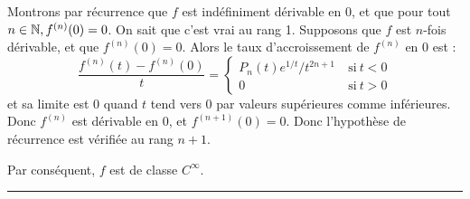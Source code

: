\documentclass[11pt,a4paper]{article}
\newcommand{\fincorrection}{\vspace{1mm}\hrule\vspace*{7mm}}
\begin{document}
\begin{enumerate}
Montrons  par r\'ecurrence que $f$ est ind\'efiniment d\'erivable en $0$,
et que pour tout   $n \in \mathbb{N},   f^{(n)}(0)=0$. On sait que
  c'est vrai au rang 1. Supposons que $f$ est $n$-fois d\'erivable, et que
  $f^{(n)}(0)=0$. Alors le taux d'accroissement de $f^{(n)}$ en $0$ est :
$$\frac{f^{(n)}(t)-f^{(n)}(0)}{t}=\begin{cases}
  P_n(t)e^{1/t}/t^{2n+1} & \mathrm{\ si\ } t<0\\
0  & \mathrm{\ si\ } t > 0
\end{cases}$$
et sa limite est $0$ quand  $t$ tend vers $0$ par valeurs sup\'erieures
comme inf\'erieures. Donc $f^{(n)}$ est d\'erivable  en $0$, et
$f^{(n+1)}(0)=0$. Donc l'hypoth\`ese de r\'ecurrence est v\'erifi\'ee  au
rang $n+1$.

Par cons\'equent, $f$ est de classe $C^\infty$.
\end{enumerate}
\fincorrection
\end{document}
